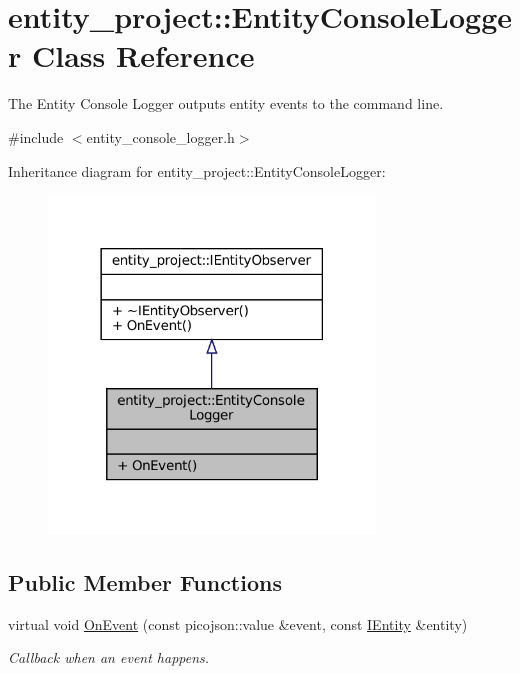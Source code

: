 \hypertarget{classentity__project_1_1EntityConsoleLogger}{}\section{entity\+\_\+project\+:\+:Entity\+Console\+Logger Class Reference}
\label{classentity__project_1_1EntityConsoleLogger}


The Entity Console Logger outputs entity events to the command line.  




{\ttfamily \#include $<$entity\+\_\+console\+\_\+logger.\+h$>$}



Inheritance diagram for entity\+\_\+project\+:\+:Entity\+Console\+Logger\+:
\nopagebreak
\begin{figure}[H]
\begin{center}
\leavevmode
\includegraphics[width=246pt]{classentity__project_1_1EntityConsoleLogger__inherit__graph}
\end{center}
\end{figure}
\subsection*{Public Member Functions}
\begin{DoxyCompactItemize}
\item 
\mbox{\label{classentity__project_1_1EntityConsoleLogger_a5079a172a767e164df8016ce06a3ce4e}} 
virtual void \hyperlink{classentity__project_1_1EntityConsoleLogger_a5079a172a767e164df8016ce06a3ce4e}{On\+Event} (const picojson\+::value \&event, const \hyperlink{classentity__project_1_1IEntity}{I\+Entity} \&entity)
\begin{DoxyCompactList}\small\item\em Callback when an event happens. \end{DoxyCompactList}\end{DoxyCompactItemize}


